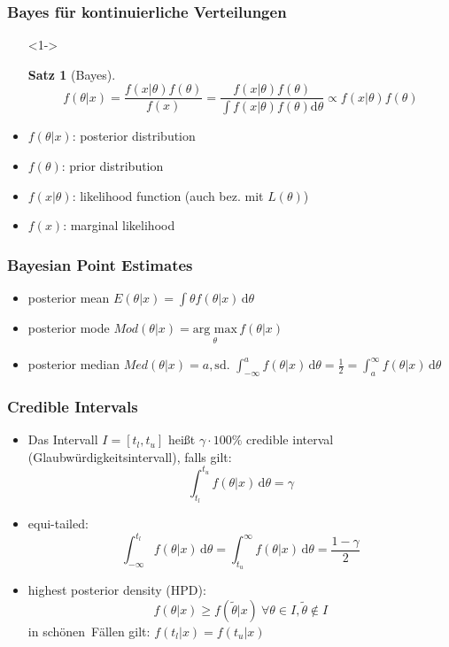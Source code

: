\documentclass[aspectratio=169,xcolor=dvipsnames]{beamer}
\newtheorem{satz}{Satz}
\begin{document}
\begin{frame}
\frametitle{Bayes für kontinuierliche Verteilungen}
\begin{itemize}
	\item[]<1-> \begin{satz}[Bayes]
		$$f(\theta|x)=\frac{f(x|\theta)f(\theta)}{f(x)}=\frac{f(x|\theta)f(\theta)}{\int f(x|\theta)f(\theta)\text{d}\theta}\propto f(x|\theta)f(\theta)$$
	\end{satz}
	\item<2-> $f(\theta|x)$: posterior distribution
	\item<2-> $f(\theta)$: prior distribution
	\item<2-> $f(x|\theta)$: likelihood function (auch bez. mit $L(\theta)$)
	\item<2-> $f(x)$: marginal likelihood
\end{itemize}
\end{frame}

\begin{frame}
\frametitle{Bayesian Point Estimates}
\begin{itemize}
	\item<1-> posterior mean $E(\theta|x)=\int \theta f(\theta|x)\,\text{d}\theta$
	\item<2-> posterior mode $Mod(\theta|x) = \underset{\theta}{\text{arg max}}\,f(\theta|x)$
	\item<3-> posterior median $Med(\theta|x) = a, \text{sd. } \int_{-\infty}^{a}f(\theta|x)\,\text{d}\theta = \frac{1}{2} = \int_{a}^{\infty}f(\theta|x)\,\text{d}\theta$
\end{itemize}
\end{frame}

\begin{frame}
\frametitle{Credible Intervals}
\begin{itemize}
	\item<1-> Das Intervall $I=[t_l,t_u]$ heißt $\gamma\cdot 100\%$ credible interval (Glaubwürdigkeitsintervall), falls gilt: $$\int_{t_l}^{t_u}f(\theta|x)\,\text{d}\theta = \gamma$$
	\item<2-> equi-tailed: $$\int_{-\infty}^{t_l}f(\theta|x)\,\text{d}\theta = \int_{t_u}^{\infty}f(\theta|x)\,\text{d}\theta = \frac{1-\gamma}{2}$$
	\item<3-> highest posterior density (HPD): $$f(\theta|x)\geq f(\tilde{\theta}|x)~\forall\theta\in I, \tilde{\theta}\notin I$$
	in \glqq schönen\grqq~Fällen gilt: $f(t_l|x)=f(t_u|x)$
\end{itemize}
\end{frame}
\end{document}
